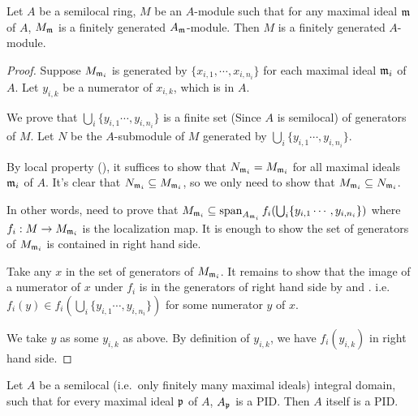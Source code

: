 \begin{lem}
\label{semilocal-fg-mod}
\leanok
Let $A$ be a semilocal ring, $M$ be an $A$-module such that
for any maximal ideal ${\mathfrak{m}}$ of $A$, $M_{\mathfrak{m}}$ is a finitely generated $A_{\mathfrak{m}}$-module.
Then $M$ is a finitely generated $A$-module.
\end{lem}

\begin{proof}
\leanok
Suppose $M_{{\mathfrak{m}}_i}$ is generated by $\{x_{i,1},\cdots, x_{i,n_i}\}$ for each maximal ideal ${\mathfrak{m}}_i$ of $A$.
Let $y_{i,k}$ be a numerator of $x_{i,k}$, which is in $A$.

We prove that $\bigcup_{i}\{y_{i,1} \cdots, y_{i,n_i}\}$
is a finite set (Since $A$ is semilocal) of generators of $M$.
Let $N$ be the $A$-submodule of $M$ generated by $\bigcup_{i}\{y_{i,1} \cdots, y_{i,n_i}\}$.

By local property (), it suffices to show that
$N_{{\mathfrak{m}}_{i}} = M_{{\mathfrak{m}}_{i}}$ for all maximal ideals ${\mathfrak{m}}_i$ of $A$.
It's clear that $N_{{\mathfrak{m}}_{i}} \subseteq  M_{{\mathfrak{m}}_{i}}$, so we only need to show that $M_{{\mathfrak{m}}_{i}} \subseteq  N_{{\mathfrak{m}}_{i}}$.

In other words, need to prove that $M_{{\mathfrak{m}}_{i}} \subseteq
\operatorname{span}_{A_{{\mathfrak{m}}_i}} f_i (\bigcup_{i}\{y_{i,1} \cdots, y_{i,n_i}\})$
where $f_i : M \to M_{{\mathfrak{m}}_i}$ is the localization map.
It is enough to show the set of generators of $M_{{\mathfrak{m}}_{i}}$ is contained in right hand side.

Take any $x$ in the set of generators of $M_{{\mathfrak{m}}_{i}}$.
It remains to show that the image of a numerator of $x$ under $f_i$
is in the generators of right hand side by
 and .
i.e. $f_i(y) \in f_i (\bigcup_{i}\{y_{i,1} \cdots, y_{i,n_i}\})$
for some numerator $y$ of $x$.

We take $y$ as some $y_{i,k}$ as above.
By definition of $y_{i,k}$, we have $f_i(y_{i,k})$ in right hand side.
\end{proof}

\begin{lem}
\label{semilocal-PID}
\leanok
Let $A$ be a semilocal (i.e.~only finitely many maximal ideals)
integral domain,
such that for every maximal ideal ${\mathfrak{p}}$ of $A$, $A_{\mathfrak{p}}$ is a PID.
Then $A$ itself is a PID.
\end{lem}

